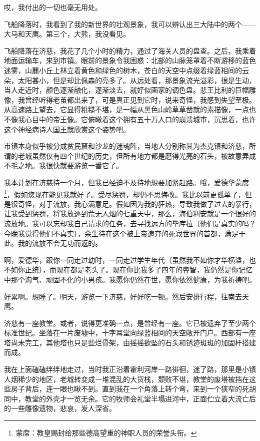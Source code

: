 \documentclass[AutoFakeBold=true]{book}
\begin{document}
哎，我付出的一切也毫无用处。

飞船降落时，我看到了我的新世界的壮观景象，我可以辨认出三大陆中的两个——大马和天鹰。第三个，大熊，我没看见。

飞船降落在济慈，我花了几个小时的精力，通过了海关人员的盘查。之后，我乘着地面运输车，来到市镇。眼前的景象令我困惑：北部的山脉笼罩着不断游移的蓝色迷雾，山麓小丘上林立着黄色和绿色的树木，苍白的天空中点缀着绿蓝相间的云朵，太阳甚小，但是却比佩森的亮多了。从远处看，那景象流光溢彩，很是生动，当人走近时，颜色逐渐融化，逐渐淡去，就好似画家的调色盘。悲王比利的巨幅雕像，我曾经听得老茧都出来了，可是真正见到它时，说来奇怪，我感到失望至极。从高速路上望去，它显得粗糙不堪，是一幅从黑色山岭草草凿就的素描像，一点也不像我心目中的帝王像。它俯瞰着这个拥有五十万人口的崩溃城市，沉思着，也许这个神经病诗人国王就欣赏这个姿势吧。

市镇本身似乎被分成贫民窟和沙龙的迷魂阵，当地人分别称其为杰克镇和济慈，所谓的老城虽然仅有四个世纪的历史，但所有地方都是磨得光亮的石头，被故意弄成不毛之地。我很快就要游览一番它了。

我本计划在济慈待一个月，但我已经迫不及待地想要加紧赶路。哦，爱德华蒙席\footnote{蒙席：教皇赐封给那些德高望重的神职人员的荣誉头衔。}，假如您现在能见我就好了。受尽惩罚，却仍不思悔改。我比以前更孤单了，但是很奇怪，对于流放，我心满意足。假如因为我的狂热，导致我做了过去的暴行，让我受到惩罚，将我放逐到荒无人烟的七重天中，那么，海伯利安就是一个很好的流放地。我可以忘却我自己请求的任务，去寻找远方的毕库拉（他们是真实的吗？今晚我觉得他们不真实），余生待在这个被上帝遗弃的死寂世界的首都，满足于此。我的流放不会无功而返的。

啊，爱德华，跟你一同走过幼时，一同走过学生年代（虽然我不如你才华横溢，也不如你正统），而现在都是老头了。现在你比我多了四年的睿智，我仍然是你记忆中那个淘气、顽固不化的小男孩。我愿你仍然在世，愿你依然健康，为我祈祷吧。

好累啊。想睡了。明天，游览一下济慈，好好吃一顿。然后安排行程，往南去天鹰。

\vspace*{1em}{\kaishu 第五日：}

济慈有一座教堂。或者，说得更准确一点，是曾经有一座。它已被遗弃了至少两个标准世纪。坐落在一片废墟中，十字耳堂向绿蓝相间的天空敞开门户。西部有一座塔尚未完工，其他塔也只是些烂骨架，由摇摇欲坠的石头和锈迹斑斑的加固杆搭建而成。

我在上面磕磕绊绊地走过，当时我正沿着霍利河岸一路徘徊，迷了路，那里是小镇人烟稀少的地区，老城转变成一堆混乱的大货栈，颓败不堪，教堂的废塔被挡在这些房子背后，连一眼也瞅不到。直到我在一个角落上转个弯，来到一个狭窄的死胡同中，教堂的外壳才一览无余。它的牧师会礼堂半塌进河中，正面伫立着大流亡后的一些雕像遗物，悲哀，发人深省。
\end{document}
